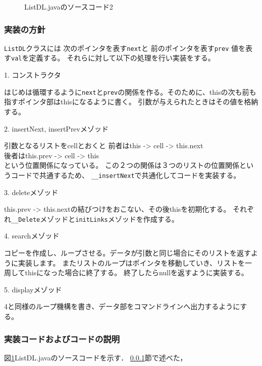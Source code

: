 \documentclass[10.5pt,a4paper]{jsarticle}
\newcommand{\figref}[1]{図\ref{#1}}
\newcommand{\secref}[1]{\ref{#1}節}
\begin{document}
\begin{figure}[t]
  \begin{center}
   
   \caption{ListDL.javaのソースコード2}
   \label{code:ListDL}
  \end{center}
\end{figure}

\subsubsection{実装の方針}\label{sec:bs_impl_policy}

\texttt{ListDL}クラスには
次のポインタを表す\texttt{next}と
前のポインタを表す\texttt{prev}
値を表す\texttt{val}を定義する。
それらに対して以下の処理を行い実装をする。

1. コンストラクタ

はじめは循環するように\texttt{next}と\texttt{prev}の関係を作る。そのために、thisの次も前も指すポインタ部はthisになるように書く。
引数が与えられたときはその値を格納する。

2. insertNext, insertPrevメゾッド

引数となるリストをcellとおくと
前者はthis -> cell -> this.next\\
後者はthis.prev -> cell -> this\\
という位置関係になっている。
この２つの関係は３つのリストの位置関係というコードで共通するため、
\texttt{\_\_insertNext}で共通化してコードを実装する。

3. deleteメゾッド

this.prev -> this.nextの結びつけをおこない、その後thisを初期化する。
それぞれ\texttt{\_\_Delete}メゾッドと\texttt{initLinks}メゾッドを作成する。

4. searchメゾッド

コピーを作成し、ループさせる。データが引数と同じ場合にそのリストを返すように実装します。
またリストのループはポインタを移動していき、リストを一周してthisになった場合に終了する。
終了したらnullを返すように実装する。

5. displayメゾッド

4と同様のループ機構を書き、データ部をコマンドラインへ出力するようにする。

\subsubsection{実装コードおよびコードの説明}

\figref{code:ListDL}ListDL.javaのソースコードを示す．
\secref{sec:bs_impl_policy}で述べた，
\end{document}

